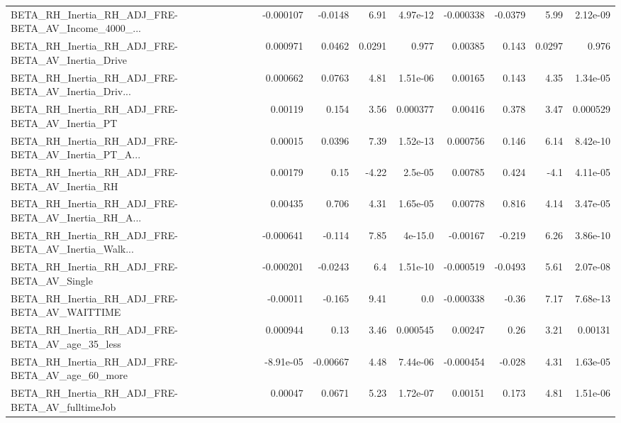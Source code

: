 \begin{tabular}{lrrrrrrrr}
BETA\_RH\_Inertia\_RH\_ADJ\_FRE-BETA\_AV\_Income\_4000\_... &   -0.000107 &      -0.0148 &     6.91 & 4.97e-12 &  -0.000338 &     -0.0379 &         5.99 &      2.12e-09 \\
BETA\_RH\_Inertia\_RH\_ADJ\_FRE-BETA\_AV\_Inertia\_Drive   &    0.000971 &       0.0462 &   0.0291 &    0.977 &    0.00385 &       0.143 &       0.0297 &         0.976 \\
BETA\_RH\_Inertia\_RH\_ADJ\_FRE-BETA\_AV\_Inertia\_Driv... &    0.000662 &       0.0763 &     4.81 & 1.51e-06 &    0.00165 &       0.143 &         4.35 &      1.34e-05 \\
BETA\_RH\_Inertia\_RH\_ADJ\_FRE-BETA\_AV\_Inertia\_PT      &     0.00119 &        0.154 &     3.56 & 0.000377 &    0.00416 &       0.378 &         3.47 &      0.000529 \\
BETA\_RH\_Inertia\_RH\_ADJ\_FRE-BETA\_AV\_Inertia\_PT\_A... &     0.00015 &       0.0396 &     7.39 & 1.52e-13 &   0.000756 &       0.146 &         6.14 &      8.42e-10 \\
BETA\_RH\_Inertia\_RH\_ADJ\_FRE-BETA\_AV\_Inertia\_RH      &     0.00179 &         0.15 &    -4.22 &  2.5e-05 &    0.00785 &       0.424 &         -4.1 &      4.11e-05 \\
BETA\_RH\_Inertia\_RH\_ADJ\_FRE-BETA\_AV\_Inertia\_RH\_A... &     0.00435 &        0.706 &     4.31 & 1.65e-05 &    0.00778 &       0.816 &         4.14 &      3.47e-05 \\
BETA\_RH\_Inertia\_RH\_ADJ\_FRE-BETA\_AV\_Inertia\_Walk... &   -0.000641 &       -0.114 &     7.85 &  4e-15.0 &   -0.00167 &      -0.219 &         6.26 &      3.86e-10 \\
BETA\_RH\_Inertia\_RH\_ADJ\_FRE-BETA\_AV\_Single          &   -0.000201 &      -0.0243 &      6.4 & 1.51e-10 &  -0.000519 &     -0.0493 &         5.61 &      2.07e-08 \\
BETA\_RH\_Inertia\_RH\_ADJ\_FRE-BETA\_AV\_WAITTIME        &    -0.00011 &       -0.165 &     9.41 &      0.0 &  -0.000338 &       -0.36 &         7.17 &      7.68e-13 \\
BETA\_RH\_Inertia\_RH\_ADJ\_FRE-BETA\_AV\_age\_35\_less     &    0.000944 &         0.13 &     3.46 & 0.000545 &    0.00247 &        0.26 &         3.21 &       0.00131 \\
BETA\_RH\_Inertia\_RH\_ADJ\_FRE-BETA\_AV\_age\_60\_more     &   -8.91e-05 &     -0.00667 &     4.48 & 7.44e-06 &  -0.000454 &      -0.028 &         4.31 &      1.63e-05 \\
BETA\_RH\_Inertia\_RH\_ADJ\_FRE-BETA\_AV\_fulltimeJob     &     0.00047 &       0.0671 &     5.23 & 1.72e-07 &    0.00151 &       0.173 &         4.81 &      1.51e-06 \\

\end{tabular}
